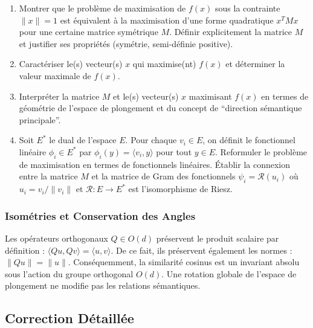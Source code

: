 \documentclass[11pt,a4paper]{report}
\begin{document}
\begin{enumerate}
\def\labelenumi{\arabic{enumi}.}

\item
  Montrer que le problème de maximisation de \(f(x)\) sous la contrainte
  \(\|x\|=1\) est équivalent à la maximisation d'une forme quadratique
  \(x^T M x\) pour une certaine matrice symétrique \(M\). Définir
  explicitement la matrice \(M\) et justifier ses propriétés (symétrie,
  semi-définie positive).
\item
  Caractériser le(s) vecteur(s) \(x\) qui maximise(nt) \(f(x)\) et
  déterminer la valeur maximale de \(f(x)\).
\item
  Interpréter la matrice \(M\) et le(s) vecteur(s) \(x\) maximisant
  \(f(x)\) en termes de géométrie de l'espace de plongement et du
  concept de ``direction sémantique principale''.
\item
  Soit \(E^*\) le dual de l'espace \(E\). Pour chaque \(v_i \in E\), on
  définit le fonctionnel linéaire \(\phi_i \in E^*\) par
  \(\phi_i(y) = \langle v_i, y \rangle\) pour tout \(y \in E\).
  Reformuler le problème de maximisation en termes de fonctionnels
  linéaires. Établir la connexion entre la matrice \(M\) et la matrice
  de Gram des fonctionnels \(\psi_i = \mathcal{R}(u_i)\) où
  \(u_i = v_i/\|v_i\|\) et \(\mathcal{R}: E \to E^*\) est l'isomorphisme
  de Riesz.
\end{enumerate}

\hypertarget{isomuxe9tries-et-conservation-des-angles}{%
\subsubsection{Isométries et Conservation des
Angles}\label{isomuxe9tries-et-conservation-des-angles}}

Les opérateurs orthogonaux \(Q \in O(d)\) préservent le produit scalaire
par définition : \(\langle Qu, Qv \rangle = \langle u, v \rangle\). De
ce fait, ils préservent également les normes : \(\|Qu\| = \|u\|\).
Conséquemment, la similarité cosinus est un invariant absolu sous
l'action du groupe orthogonal \(O(d)\). Une rotation globale de l'espace
de plongement ne modifie pas les relations sémantiques.

\hypertarget{correction-duxe9tailluxe9e}{%
\subsection{Correction Détaillée}\label{correction-duxe9tailluxe9e}}
\end{document}
